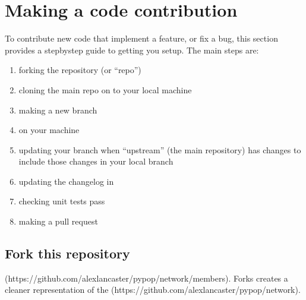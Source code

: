 \documentclass[letterpaper,10pt,english,openany,oneside]{sphinxmanual}
\begin{document}
\section{Making a code contribution}
\label{\detokenize{docs/guide-chapter-contributing:making-a-code-contribution}}
\sphinxAtStartPar
To contribute new code that implement a feature, or fix a bug, this
section provides a step\sphinxhyphen{}by\sphinxhyphen{}step guide to getting you set\sphinxhyphen{}up.  The main
steps are:
\begin{enumerate}
%
\item {} 
\sphinxAtStartPar
forking the repository (or “repo”)

\item {} 
\sphinxAtStartPar
cloning the main repo on to your local machine

\item {} 
\sphinxAtStartPar
making a new branch

\item {} 
\sphinxAtStartPar
{\hyperref[\detokenize{docs/guide-chapter-contributing:installation-for-developers}]{}} on your machine

\item {} 
\sphinxAtStartPar
updating your branch when “upstream” (the main repository) has changes to include those changes in your local branch

\item {} 
\sphinxAtStartPar
updating the changelog in 

\item {} 
\sphinxAtStartPar
checking unit tests pass

\item {} 
\sphinxAtStartPar
making a pull request

\end{enumerate}


\subsection{Fork this repository}
\label{\detokenize{docs/guide-chapter-contributing:fork-this-repository}}
\sphinxAtStartPar
{} (https://github.com/alexlancaster/pypop/network/members). Forks creates a cleaner representation of the  (https://github.com/alexlancaster/pypop/network).
\end{document}
